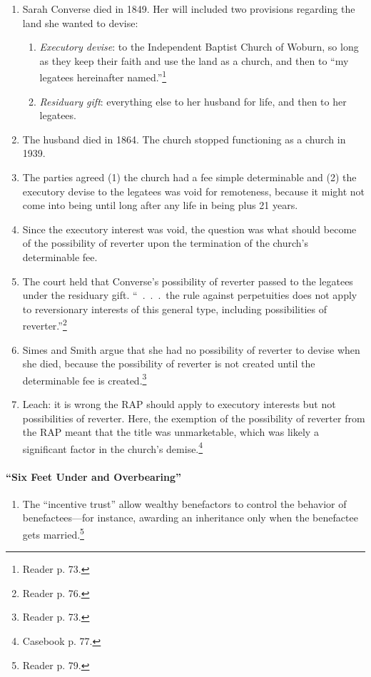 \begin{enumerate}
    \item Sarah Converse died in 1849. Her will included two provisions 
    regarding the land she wanted to devise:
    \begin{enumerate}
        \item \emph{Executory devise}: to the Independent Baptist Church of 
        Woburn, so long as they keep their faith and use the land as a church, 
        and then to ``my legatees hereinafter named.''\footnote{Reader p. 73.} 
        \item \emph{Residuary gift}: everything else to her husband for life, 
        and then to her legatees.
    \end{enumerate}
    \item The husband died in 1864. The church stopped functioning as a church 
    in 1939.
    \item The parties agreed (1) the church had a fee simple determinable and 
    (2) the executory devise to the legatees was void for remoteness, because 
    it might not come into being until long after any life in being plus 21 
    years.
    \item Since the executory interest was void, the question was what should 
    become of the possibility of reverter upon the termination of the church's 
    determinable fee.
    \item The court held that Converse's possibility of reverter passed to the 
    legatees under the residuary gift. ``~.~.~.~the rule against perpetuities 
    does not apply to reversionary interests of this general type, including 
    possibilities of reverter.''\footnote{Reader p. 76.}
    \item Simes and Smith argue that she had no possibility of reverter to 
    devise when she died, because the possibility of reverter is not created 
    until the determinable fee is created.\footnote{Reader p. 73.}
    \item Leach: it is wrong the RAP should apply to executory interests but 
    not possibilities of reverter. Here, the exemption of the possibility of 
    reverter from the RAP meant that the title was unmarketable, which was 
    likely a significant factor in the church's demise.\footnote{Casebook p. 
    77.}
\end{enumerate}

\paragraph{``Six Feet Under and Overbearing''}
\begin{enumerate}
    \item The ``incentive trust'' allow wealthy benefactors to control the 
    behavior of benefactees---for instance, awarding an inheritance only when 
    the benefactee gets married.\footnote{Reader p. 79.}
\end{enumerate}

